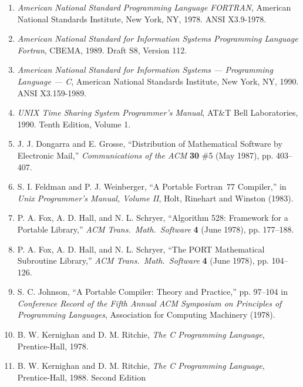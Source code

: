 \documentclass[12pt]{article}
\begin{document}
\begin{enumerate}
\item \emph{American National Standard Programming Language FORTRAN}, American National Standards Institute, New York, NY, 1978. ANSI X3.9-1978.

\item \emph{American National Standard for Information Systems Programming Language Fortran}, CBEMA, 1989. Draft S8, Version 112.

\item \emph{American National Standard for Information Systems --- Programming Language --- C}, American National Standards Institute, New York, NY, 1990. ANSI X3.159-1989.

\item \emph{UNIX Time Sharing System Programmer's Manual}, AT\&T Bell Laboratories, 1990. Tenth Edition, Volume 1.

\item J. J. Dongarra and E. Grosse, ``Distribution of Mathematical Software by Electronic Mail,'' \emph{Communications of the ACM} \textbf{30} \#5 (May 1987), pp. 403--407.

\item S. I. Feldman and P. J. Weinberger, ``A Portable Fortran~77 Compiler,'' in \emph{Unix Programmer's Manual, Volume II}, Holt, Rinehart and Winston (1983).

\item P. A. Fox, A. D. Hall, and N. L. Schryer, ``Algorithm 528: Framework for a Portable Library,'' \emph{ACM Trans.\ Math.\ Software} \textbf{4} (June 1978), pp. 177--188.

\item  P. A. Fox, A. D. Hall, and N. L. Schryer, ``The   PORT  Mathematical Subroutine Library,'' \emph{ACM Trans.\ Math.\ Software} \textbf{4} (June 1978), pp. 104--126.

\item  S. C. Johnson, ``A Portable Compiler: Theory and Practice,'' pp. 97--104 in \emph{Conference Record of the Fifth Annual ACM Symposium on Principles of Programming Languages}, Association for Computing Machinery (1978).

\item B. W. Kernighan and D. M. Ritchie, \emph{The C Programming Language}, Prentice-Hall, 1978.

\item B. W. Kernighan and D. M. Ritchie, \emph{The C Programming Language}, Prentice-Hall, 1988. Second Edition


\end{enumerate}
\end{document}
